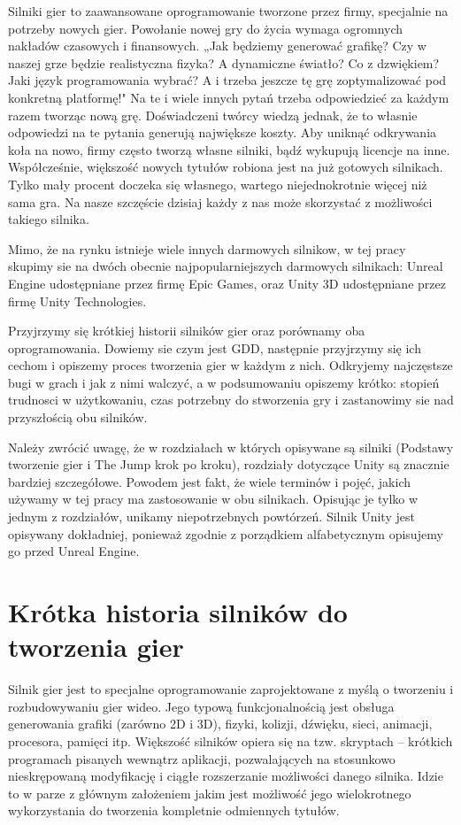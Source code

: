 \documentclass[brudnopis]{xmgr}
\begin{document}
Silniki gier to zaawansowane oprogramowanie tworzone przez firmy, specjalnie na potrzeby nowych gier. Powołanie nowej gry do życia wymaga ogromnych nakładów czasowych i finansowych. „Jak będziemy generować grafikę? Czy w naszej grze będzie realistyczna fizyka? A dynamiczne światło? Co z dzwiękiem? Jaki język programowania wybrać? A i trzeba jeszcze tę grę zoptymalizować pod konkretną platformę!" Na te i wiele innych pytań trzeba odpowiedzieć za każdym razem tworząc nową grę. Doświadczeni twórcy wiedzą jednak, że to własnie odpowiedzi na te pytania generują największe koszty. Aby uniknąć odkrywania koła na nowo, firmy często tworzą własne silniki, bądź wykupują licencje na inne. Współcześnie, większość nowych tytułów robiona jest na już gotowych silnikach. Tylko mały procent doczeka się własnego, wartego niejednokrotnie więcej niż sama gra. 
Na nasze szczęście dzisiaj każdy z nas może skorzystać z możliwości takiego silnika. 

Mimo, że na rynku istnieje wiele innych darmowych silnikow, w tej pracy skupimy sie na dwóch obecnie najpopularniejszych darmowych silnikach:
Unreal Engine udostępniane przez firmę Epic Games, oraz Unity 3D udostępniane przez firmę Unity Technologies. 

Przyjrzymy się krótkiej historii silników gier oraz porównamy oba oprogramowania. Dowiemy sie czym jest GDD, następnie przyjrzymy się ich cechom i opiszemy proces tworzenia gier w każdym z nich. Odkryjemy najczęstsze bugi w grach i jak z nimi walczyć, a w podsumowaniu opiszemy krótko: stopień trudnosci w użytkowaniu, czas potrzebny do stworzenia gry i zastanowimy sie nad przyszłością obu silników.

Należy zwrócić uwagę, że w rozdziałach w których opisywane są silniki (Podstawy tworzenie gier i The Jump krok po kroku), rozdziały dotyczące Unity są znacznie bardziej szczegółowe. Powodem jest fakt, że wiele terminów i pojęć, jakich używamy w tej pracy ma zastosowanie w obu silnikach. Opisując je tylko w jednym z rozdziałów, unikamy niepotrzebnych powtórzeń. Silnik Unity jest opisywany dokładniej, ponieważ zgodnie z porządkiem alfabetycznym opisujemy go przed Unreal Engine.

\chapter{Krótka historia silników do tworzenia gier}

Silnik gier jest to specjalne oprogramowanie zaprojektowane z myślą o tworzeniu i rozbudowywaniu gier wideo. Jego typową funkcjonalnością jest obsługa generowania grafiki (zarówno 2D i 3D), fizyki, kolizji, dźwięku, sieci, animacji, procesora, pamięci itp. Większość silników opiera się na tzw. skryptach – krótkich programach pisanych wewnątrz aplikacji, pozwalających na stosunkowo nieskrępowaną modyfikację i ciągłe rozszerzanie możliwości danego silnika. Idzie to w parze z głównym założeniem jakim jest możliwość jego wielokrotnego wykorzystania do tworzenia kompletnie odmiennych tytułów.  
\end{document}
